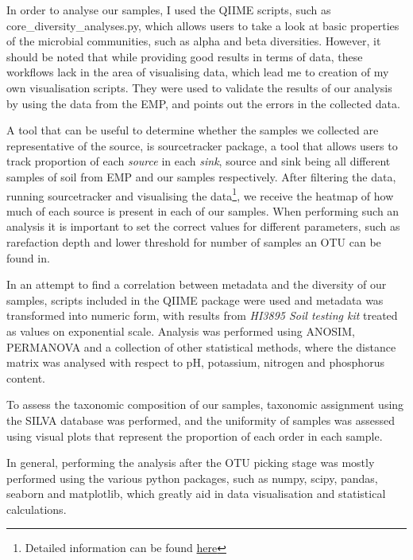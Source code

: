 \documentclass{article}
\begin{document}
\begin{multicols}{2}
\par
In order to analyse our samples, I used the QIIME scripts, such as core\_diversity\_analyses.py, which allows users to take a look at basic properties of the microbial communities, such as alpha and beta diversities. However, it should be noted that while providing good results in terms of data, these workflows lack in the area of visualising data, which lead me to creation of my own visualisation scripts\cite{Anonymous2018}. They were used to validate the results of our analysis by using the data from the EMP, and points out the errors in the collected data.
\par
A tool that can be useful to determine whether the samples we collected are representative of the source, is sourcetracker package\cite{Knights2011}, a tool that allows users to track proportion of each \textit{source} in each \textit{sink}, source and sink being all different samples of soil from EMP and our samples respectively. After filtering the data, running sourcetracker and visualising the data\footnote{Detailed information can be found \href{https://github.com/nameisBaron-MichaelBaron/BIOC3301/tree/master/sourcetracker}{here}}, we receive the heatmap of how much of each source is present in each of our samples. When performing such an analysis it is important to set the correct values for different parameters, such as rarefaction depth and lower threshold for number of samples an OTU can be found in.
\par
In an attempt to find a correlation between metadata and the diversity of our samples, scripts included in the QIIME package were used and metadata was transformed into numeric form, with results from \textit{HI3895 Soil testing kit} treated as values on exponential scale. Analysis was performed using ANOSIM\cite{CLARKE1993}, PERMANOVA\cite{Tang2016} and a collection of other statistical methods, where the distance matrix was analysed with respect to pH, potassium, nitrogen and phosphorus content.
\par
To assess the taxonomic composition of our samples, taxonomic assignment using the SILVA\cite{Quast2012} database was performed, and the uniformity of samples was assessed using visual plots that represent the proportion of each order in each sample. 
\par
In general, performing the analysis after the OTU picking stage was mostly performed using the various python packages, such as numpy, scipy, pandas, seaborn and matplotlib, which greatly aid in data visualisation and statistical calculations.


\end{multicols}
\end{document}
